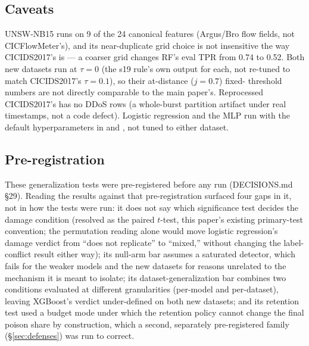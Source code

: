 \subsection{Caveats}
UNSW-NB15 runs on 9 of the 24 canonical features (Argus/Bro flow fields, not CICFlowMeter's), and
its near-duplicate grid choice is not insensitive the way CICIDS2017's is — a coarser grid changes
RF's eval TPR from 0.74 to 0.52. Both new datasets run at $\tau=0$ (the s19 rule's own output for
each, not re-tuned to match CICIDS2017's $\tau=0.1$), so their at-distance ($j=0.7$) fixed-
threshold numbers are not directly comparable to the main paper's. Reprocessed CICIDS2017's
 has no DDoS rows (a whole-burst partition artifact under real timestamps, not
a code defect). Logistic regression and the MLP run with the default hyperparameters in
 and , not tuned to either
dataset.

\subsection{Pre-registration}
These generalization tests were pre-registered before any run (DECISIONS.md \S29). Reading the
results against that pre-registration surfaced four gaps in it, not in how the tests were run:
it does not say which significance test decides the damage condition (resolved as the paired
$t$-test, this paper's existing primary-test convention; the permutation reading alone would move
logistic regression's damage verdict from “does not replicate” to “mixed,” without changing the
label-conflict result either way); its null-arm bar assumes a saturated detector, which fails for
the weaker models and the new datasets for reasons unrelated to the mechanism it is meant to
isolate; its dataset-generalization bar combines two conditions evaluated at different
granularities (per-model and per-dataset), leaving XGBoost's verdict under-defined on both new
datasets; and its retention test used a budget mode under which the retention policy cannot
change the final poison share by construction, which a second, separately pre-registered family
(\S\ref{sec:defenses}) was run to correct.
